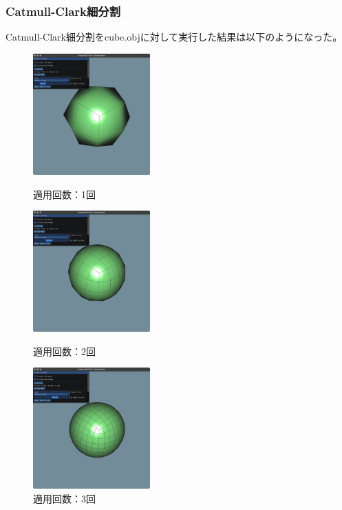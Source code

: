 \documentclass[a4paper,10pt,uplatex,dvipdfmx]{jsarticle}
\begin{document}
\subsubsection{Catmull-Clark細分割}
Catmull-Clark細分割をcube.objに対して実行した結果は以下のようになった。
\begin{figure}[htbp]
  \begin{minipage}{0.33\hsize}
    \begin{center}
      \includegraphics[width=45mm]{img/catmull-cube-1.png}
      \caption{適用回数：1回}
    \end{center}
  \end{minipage}
  \begin{minipage}{0.33\hsize}
    \begin{center}
      \includegraphics[width=45mm]{img/catmull-cube-2.png}
      \caption{適用回数：2回}
    \end{center}
  \end{minipage}
  \begin{minipage}{0.33\hsize}
    \begin{center}
      \includegraphics[width=45mm]{img/catmull-cube-3.png}
      \caption{適用回数：3回}
    \end{center}
  \end{minipage}
\end{figure}
\end{document}
